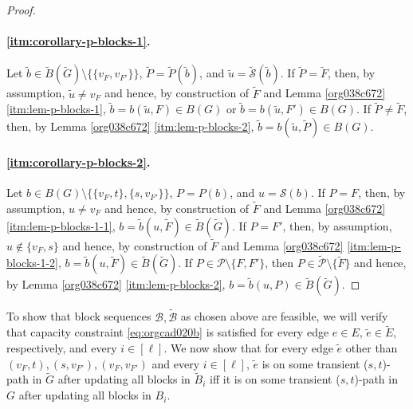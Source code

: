 \documentclass[fontsize=11pt,paper=a4]{book}
\begin{document}
\begin{proof}
~
\paragraph{\ref{itm:corollary-p-blocks-1}.}
Let \(\tilde{b}\in\tilde{B}(\tilde{G})\setminus\{\{v_F,v_{F'}\}\}\), \(\tilde{P}=\tilde{P}(\tilde{b})\), and \(\tilde{u}=\tilde{\mathcal{S}}(\tilde{b})\).
If \(\tilde{P}=\tilde{F}\), then, by assumption, \(\tilde{u}\neq v_F\) and hence, by construction of \(\tilde{F}\) and Lemma \ref{org038c672} \ref{itm:lem-p-blocks-1}, \(\tilde{b}=b(\tilde{u},F)\in B(G)\) or \(\tilde{b}=b(\tilde{u},F')\in B(G)\).
If \(\tilde{P}\neq\tilde{F}\), then, by Lemma \ref{org038c672} \ref{itm:lem-p-blocks-2}, \(\tilde{b}=b(\tilde{u},\tilde{P})\in B(G)\).


\paragraph{\ref{itm:corollary-p-blocks-2}.}
Let \(b\in B(G)\setminus\{\{v_F,t\},\{s,v_{F'}\}\}\), \(P=P(b)\), and \(u=\mathcal{S}(b)\).
If \(P=F\), then, by assumption, \(u\neq v_F\) and hence, by construction of \(\tilde{F}\) and Lemma \ref{org038c672} \ref{itm:lem-p-blocks-1-1}, \(b=\tilde{b}(u,\tilde{F})\in\tilde{B}(\tilde{G})\).
If \(P=F'\), then, by assumption, \(u\notin\{v_F,s\}\) and hence, by construction of \(\tilde{F}\) and Lemma \ref{org038c672} \ref{itm:lem-p-blocks-1-2}, \(b=\tilde{b}(u,\tilde{F})\in\tilde{B}(\tilde{G})\).
If \(P\in\mathcal{P}\setminus\{F,F'\}\), then \(P\in\tilde{\mathcal{P}}\setminus\{\tilde{F}\}\) and hence, by Lemma \ref{org038c672} \ref{itm:lem-p-blocks-2}, \(b=\tilde{b}(u,P)\in\tilde{B}(\tilde{G})\).
\end{proof}

To show that block sequences \(\mathcal{B},\tilde{\mathcal{B}}\) as chosen above are feasible, we will verify that capacity constraint \ref{eq:orgcad020b} is satisfied for every edge \(e\in E\), \(\tilde{e}\in\tilde{E}\), respectively, and every \(i\in[\ell]\).
We now show that for every edge \(\tilde{e}\) other than \((v_F,t),(s,v_{F'}),(v_F,v_{F'})\) and every \(i\in[\ell]\), \(\tilde{e}\) is on some transient (\(s,t\))-path in \(\tilde{G}\) after updating all blocks in \(\tilde{B}_i\) iff it is on some transient (\(s,t\))-path in \(G\) after updating all blocks in \(B_i\).
\end{document}
